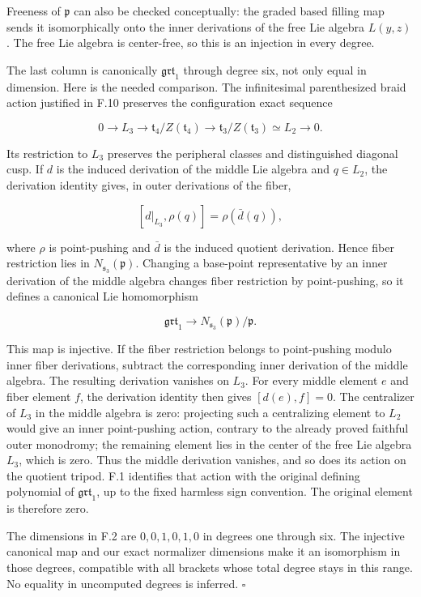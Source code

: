 \documentclass[10pt,a4paper]{article}
\begin{document}
Freeness of \(\mathfrak p\) can also be checked conceptually: the graded based filling map sends it isomorphically onto the inner derivations of the free Lie algebra \(L(y,z)\). The free Lie algebra is center-free, so this is an injection in every degree.

The last column is canonically \(\mathfrak{grt}_1\) through degree six, not only equal in dimension. Here is the needed comparison. The infinitesimal parenthesized braid action justified in F.10 preserves the configuration exact sequence

\[
 0\longrightarrow L_3\longrightarrow
 \mathfrak t_4/Z(\mathfrak t_4)\longrightarrow
 \mathfrak t_3/Z(\mathfrak t_3)\simeq L_2\longrightarrow0.
\]

Its restriction to \(L_3\) preserves the peripheral classes and distinguished diagonal cusp. If \(d\) is the induced derivation of the middle Lie algebra and \(q\in L_2\), the derivation identity gives, in outer derivations of the fiber,

\[
 [d|_{L_3},\rho(q)]=\rho(\bar d(q)),
\]

where \(\rho\) is point-pushing and \(\bar d\) is the induced quotient derivation. Hence fiber restriction lies in \(N_{\mathfrak s_3}(\mathfrak p)\). Changing a base-point representative by an inner derivation of the middle algebra changes fiber restriction by point-pushing, so it defines a canonical Lie homomorphism

\[
 \mathfrak{grt}_1\longrightarrow N_{\mathfrak s_3}(\mathfrak p)/\mathfrak p.
\]

This map is injective. If the fiber restriction belongs to point-pushing modulo inner fiber derivations, subtract the corresponding inner derivation of the middle algebra. The resulting derivation vanishes on \(L_3\). For every middle element \(e\) and fiber element \(f\), the derivation identity then gives \([d(e),f]=0\). The centralizer of \(L_3\) in the middle algebra is zero: projecting such a centralizing element to \(L_2\) would give an inner point-pushing action, contrary to the already proved faithful outer monodromy; the remaining element lies in the center of the free Lie algebra \(L_3\), which is zero. Thus the middle derivation vanishes, and so does its action on the quotient tripod. F.1 identifies that action with the original defining polynomial of \(\mathfrak{grt}_1\), up to the fixed harmless sign convention. The original element is therefore zero.

The dimensions in F.2 are \(0,0,1,0,1,0\) in degrees one through six. The injective canonical map and our exact normalizer dimensions make it an isomorphism in those degrees, compatible with all brackets whose total degree stays in this range. No equality in uncomputed degrees is inferred. \(\square\)
\end{document}
